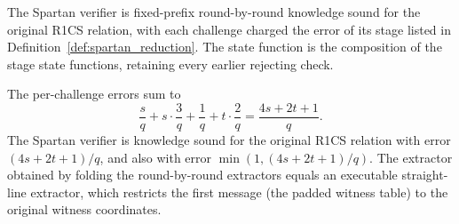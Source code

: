 \begin{theorem}
    \label{thm:spartan_rbr}
    \leanok
    The Spartan verifier is fixed-prefix round-by-round knowledge sound for the original R1CS
    relation, with each challenge charged the error of its stage listed in
    Definition~\ref{def:spartan_reduction}. The state function is the composition of the stage
    state functions, retaining every earlier rejecting check.
\end{theorem}

\begin{theorem}
    \label{thm:spartan_knowledge_soundness}
    \leanok
    The per-challenge errors sum to
    \[
      \frac{s}{q} + s \cdot \frac{3}{q} + \frac{1}{q} + t \cdot \frac{2}{q} = \frac{4s + 2t + 1}{q}.
    \]
    The Spartan verifier is knowledge sound for the original R1CS relation with error
    $(4s + 2t + 1)/q$, and also with error $\min(1, (4s + 2t + 1)/q)$. The extractor obtained by
    folding the round-by-round extractors equals an executable straight-line extractor, which
    restricts the first message (the padded witness table) to the original witness coordinates.
\end{theorem}
